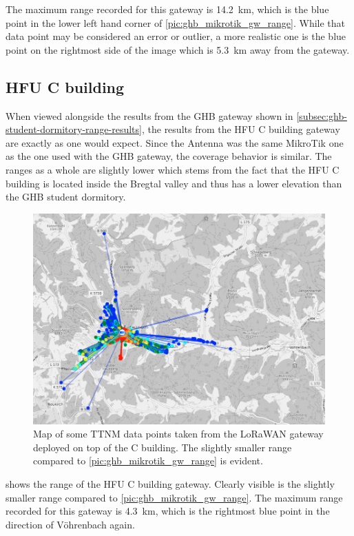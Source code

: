 The maximum range recorded for this gateway is \SI{14.2}{\kilo\meter}, which is the blue point in the lower left hand corner of \cref{pic:ghb_mikrotik_gw_range}.
While that data point may be considered an error or outlier, a more realistic one is the blue point on the rightmost side of the image which is \SI{5.3}{\kilo\meter} away from the gateway.

\subsection{\ac{HFU} C building}

When viewed alongside the results from the \ac{GHB} gateway shown in \cref{subsec:ghb-student-dormitory-range-results}, the results from the \ac{HFU} C building gateway are exactly as one would expect.
Since the Antenna was the same MikroTik one as the one used with the \ac{GHB} gateway, the coverage behavior is similar.
The ranges as a whole are slightly lower which stems from the fact that the \ac{HFU} C building is located inside the Bregtal valley and thus has a lower elevation than the \ac{GHB} student dormitory.

\begin{figure}
    \centering
    \includegraphics[width=1\textwidth]{pictures/ttn-mapper/gateway-ranges/c_building_gw_range.png}
    \caption{Map of some \ac{TTNM} data points taken from the \ac{LoRaWAN} gateway deployed on top of the C building. The slightly smaller range compared to \cref{pic:ghb_mikrotik_gw_range} is evident.\label{pic:c_building_gw_range}}
\end{figure}

 shows the range of the \ac{HFU} C building gateway.
Clearly visible is the slightly smaller range compared to \cref{pic:ghb_mikrotik_gw_range}.
The maximum range recorded for this gateway is \SI{4.3}{\kilo\meter}, which is the rightmost blue point in the direction of Vöhrenbach again.

